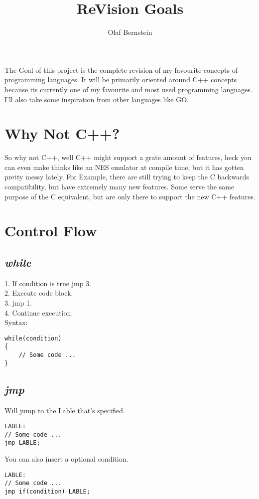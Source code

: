 \documentclass[10pt,a4paper]{article}
\author{Olaf Bernstein}
\title{ReVision Goals}
\begin{document}
\maketitle
The Goal of this project is the complete revision of my favourite concepts of programming languages. It will be primarily oriented around C++ concepts because its currently one of my favourite and most used programming languages. I'll also take some inspiration from other languages like GO.
\tableofcontents




\section{Why Not C++?}
So why not C++, well C++ might support a grate amount of features, heck you can even make thinks like an NES emulator at compile time, but it has gotten pretty messy lately. For Example, there are still trying to keep the C backwards compatibility, but have extremely many new features. Some serve the same purpose of the C equivalent, but are only there to support the new C++ features.




\section{Control Flow}


\subsection{\textit{while}}
1. If condition is true jmp 3. \\
2. Execute code block. \\
3. jmp 1. \\
4. Continue execution. \\
Syntax:
\begin{lstlisting}
while(condition)
{
	// Some code ...
}
\end{lstlisting}


\subsection{\textit{jmp}}
Will jump to the Lable that's specified.
\begin{lstlisting}
LABLE:
// Some code ...
jmp LABLE;
\end{lstlisting}
You can also insert a optional condition.
\begin{lstlisting}
LABLE:
// Some code ...
jmp if(condition) LABLE;
\end{lstlisting}
\end{document}
